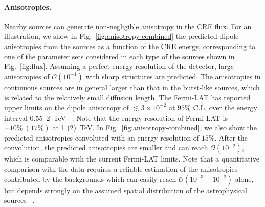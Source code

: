 \documentclass[aps,prl,twocolumn,a4paper]{revtex4}
\newcommand{\fig}[1]{Fig.~\ref{#1}}
\begin{document}
\paragraph{\bf Anisotropies.}
Nearby sources can generate non-negligible anisotropy in the CRE flux.
For an illustration,
we show in \fig{fig:anisotropy-combined}  the predicted 
dipole anisotropies from the sources as a function of the CRE energy,
corresponding to one of the  parameter sets
considered in each type of the sources shown in \fig{fig:flux}.
Assuming  a perfect energy resolution of the detector,
large anisotropies of $\mathcal{O}(10^{-1})$ with 
sharp structures  are predicted.
The anisotropies in continuous sources are in general 
larger than that in the burst-like sources,
which is  related to the relatively small diffusion length.
%
The Fermi-LAT  has reported  upper limits on the  
dipole anisotropy of $\lesssim3\times 10^{-2}$  at $95\%$ C.L.
over the energy interval  0.55--2~TeV%
~\cite{Abdollahi:2017kyf}.
Note that the energy resolution of Fermi-LAT is $\sim 10\%~(17\%)$ 
at 1 (2)~TeV.
In  \fig{fig:anisotropy-combined}, 
we also show  the predicted anisotropies convoluted 
with an energy resolution of $15\%$.
After the convolution, 
the predicted anisotropies are  smaller and can reach $\mathcal{O}(10^{-2})$,
which is comparable with  the current Fermi-LAT limits.
%
Note that a quantitative comparison with the data requires 
a reliable estimation of the anisotropies contributed by the backgrounds 
which can easily reach $\mathcal{O}(10^{-3}-10^{-2})$ alone,  but 
depends strongly on the assumed spatial distribution of 
the astrophysical sources%
~\cite{Manconi:2016byt}.
%

\end{document}

